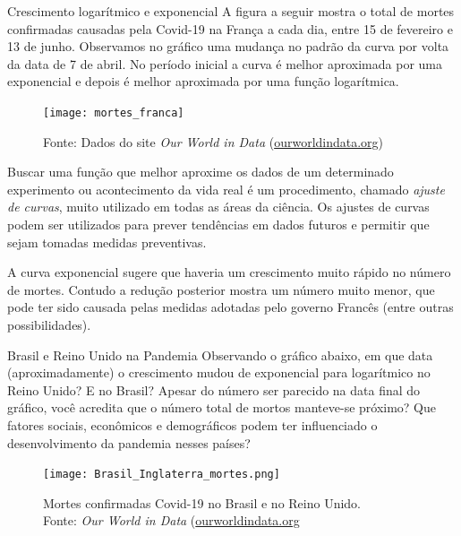 \begin{example}{Crescimento logarítmico e exponencial}
A figura a seguir mostra o total de mortes confirmadas causadas pela Covid-19 na França a cada dia, entre 15 de fevereiro e 13 de junho. Observamos no gráfico uma mudança no padrão da curva por volta da data de 7 de abril. No período inicial a curva é melhor aproximada por uma exponencial e depois é melhor aproximada por uma função logarítmica.

\begin{figure}[H]
\centering

\texttt{[image: mortes\_franca]}
\caption{Fonte: Dados do site \textit{Our World in Data} (\url{ourworldindata.org})}
\end{figure}


Buscar uma função que melhor aproxime os dados de um determinado experimento ou acontecimento da vida real é um procedimento, chamado \textit{ajuste de curvas}, muito utilizado em todas as áreas da ciência. Os ajustes de curvas podem ser utilizados para prever tendências em dados futuros e permitir que sejam tomadas medidas preventivas.

A curva exponencial sugere que haveria um crescimento muito rápido no número de mortes. Contudo a redução posterior mostra um número muito menor, que pode ter sido causada pelas medidas adotadas pelo governo Francês (entre outras possibilidades).
\end{example}


\begin{task}{Brasil e Reino Unido na Pandemia}
Observando o gráfico abaixo, em que data (aproximadamente) o crescimento mudou de exponencial para logarítmico no Reino Unido? E no Brasil? Apesar do número ser parecido na data final do gráfico, você acredita que o número total de mortos manteve-se próximo? Que fatores sociais, econômicos e demográficos podem ter influenciado o desenvolvimento da pandemia nesses países? 

\begin{figure}[H]
\centering
\texttt{[image: Brasil\_Inglaterra\_mortes.png]}

\caption{Mortes confirmadas Covid-19 no Brasil e no Reino Unido. \\ Fonte: \textit{Our World in Data} (\url{ourworldindata.org}}
\end{figure}
\end{task}


